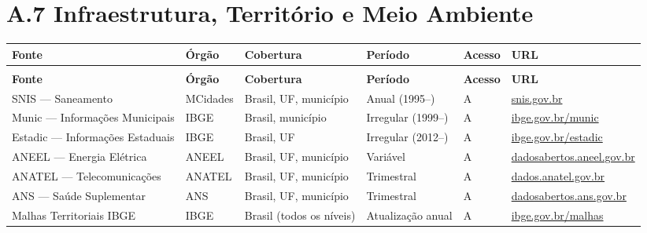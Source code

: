 \section*{A.7 Infraestrutura, Território e Meio Ambiente}

{\setlength{\tabcolsep}{3pt}\footnotesize\begin{longtable}{@{} >{\raggedright\arraybackslash}p{2.9cm} >{\raggedright\arraybackslash}p{2.3cm} >{\raggedright\arraybackslash}p{2.4cm} >{\raggedright\arraybackslash}p{2.4cm} >{\raggedright\arraybackslash}p{1.1cm} >{\raggedright\arraybackslash}p{3.2cm} @{}}
\toprule
\textbf{Fonte} & \textbf{Órgão} & \textbf{Cobertura} & \textbf{Período} & \textbf{Acesso} & \textbf{URL} \\
\midrule
\endfirsthead
\multicolumn{6}{l}{\small\textit{(continuação)}} \\
\toprule
\textbf{Fonte} & \textbf{Órgão} & \textbf{Cobertura} & \textbf{Período} & \textbf{Acesso} & \textbf{URL} \\
\midrule
\endhead
\bottomrule
\endfoot

SNIS --- Saneamento
  & MCidades
  & Brasil, UF, município
  & Anual (1995--)
  & A
  & \url{snis.gov.br} \\

Munic --- Informações Municipais
  & IBGE
  & Brasil, município
  & Irregular (1999--)
  & A
  & \url{ibge.gov.br/munic} \\

Estadic --- Informações Estaduais
  & IBGE
  & Brasil, UF
  & Irregular (2012--)
  & A
  & \url{ibge.gov.br/estadic} \\

ANEEL --- Energia Elétrica
  & ANEEL
  & Brasil, UF, município
  & Variável
  & A
  & \url{dadosabertos.aneel.gov.br} \\

ANATEL --- Telecomunicações
  & ANATEL
  & Brasil, UF, município
  & Trimestral
  & A
  & \url{dados.anatel.gov.br} \\

ANS --- Saúde Suplementar
  & ANS
  & Brasil, UF, município
  & Trimestral
  & A
  & \url{dadosabertos.ans.gov.br} \\

Malhas Territoriais IBGE
  & IBGE
  & Brasil (todos os níveis)
  & Atualização anual
  & A
  & \url{ibge.gov.br/malhas} \\


\end{longtable}}
